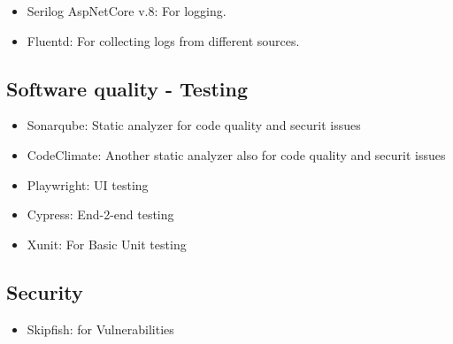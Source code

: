 \begin{itemize}
    \item Serilog AspNetCore v.8: For logging.
    \item Fluentd: For collecting logs from different sources. 
\end{itemize}


\subsection*{Software quality - Testing}

\begin{itemize}
    \item Sonarqube: Static analyzer for code quality and securit issues
    \item CodeClimate: Another static analyzer also for code quality and securit issues
    \item Playwright: UI testing 
    \item Cypress: End-2-end testing
    \item Xunit: For Basic Unit testing
\end{itemize}


\subsection*{Security}
\begin{itemize}
    \item Skipfish: for Vulnerabilities
\end{itemize}

